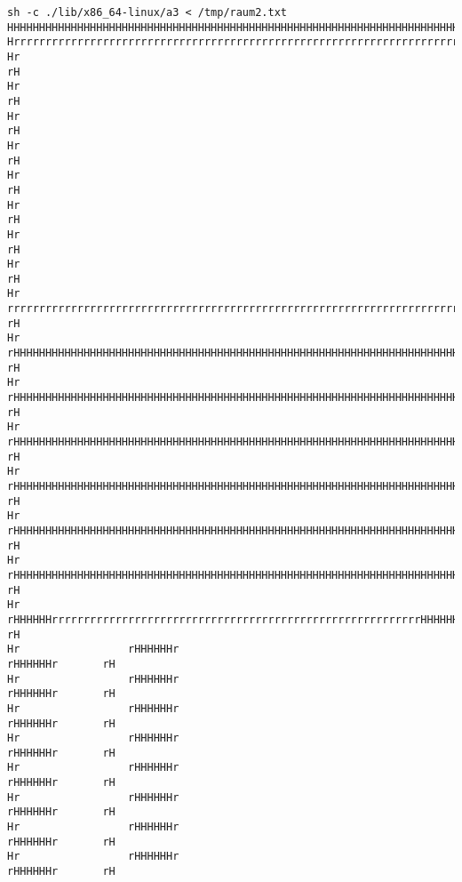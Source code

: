 \documentclass[10pt,a4paper]{article}
\begin{document}
{\begin{verbatim}
sh -c ./lib/x86_64-linux/a3 < /tmp/raum2.txt 
HHHHHHHHHHHHHHHHHHHHHHHHHHHHHHHHHHHHHHHHHHHHHHHHHHHHHHHHHHHHHHHHHHHHHHHHHHHHHHHHHHHHHHHHHHHHHHHHHHHH
HrrrrrrrrrrrrrrrrrrrrrrrrrrrrrrrrrrrrrrrrrrrrrrrrrrrrrrrrrrrrrrrrrrrrrrrrrrrrrrrrrrrrrrrrrrrrrrrrrrH
Hr                                                                                                rH
Hr                                                                                                rH
Hr                                                                                                rH
Hr                                                                                                rH
Hr                                                                                                rH
Hr                                                                                                rH
Hr                                                                                                rH
Hr                                                                                                rH
Hr                 rrrrrrrrrrrrrrrrrrrrrrrrrrrrrrrrrrrrrrrrrrrrrrrrrrrrrrrrrrrrrrrrrrrrrrrr       rH
Hr                 rHHHHHHHHHHHHHHHHHHHHHHHHHHHHHHHHHHHHHHHHHHHHHHHHHHHHHHHHHHHHHHHHHHHHHHr       rH
Hr                 rHHHHHHHHHHHHHHHHHHHHHHHHHHHHHHHHHHHHHHHHHHHHHHHHHHHHHHHHHHHHHHHHHHHHHHr       rH
Hr                 rHHHHHHHHHHHHHHHHHHHHHHHHHHHHHHHHHHHHHHHHHHHHHHHHHHHHHHHHHHHHHHHHHHHHHHr       rH
Hr                 rHHHHHHHHHHHHHHHHHHHHHHHHHHHHHHHHHHHHHHHHHHHHHHHHHHHHHHHHHHHHHHHHHHHHHHr       rH
Hr                 rHHHHHHHHHHHHHHHHHHHHHHHHHHHHHHHHHHHHHHHHHHHHHHHHHHHHHHHHHHHHHHHHHHHHHHr       rH
Hr                 rHHHHHHHHHHHHHHHHHHHHHHHHHHHHHHHHHHHHHHHHHHHHHHHHHHHHHHHHHHHHHHHHHHHHHHr       rH
Hr                 rHHHHHHrrrrrrrrrrrrrrrrrrrrrrrrrrrrrrrrrrrrrrrrrrrrrrrrrrrrrrrrrrHHHHHHr       rH
Hr                 rHHHHHHr                                                        rHHHHHHr       rH
Hr                 rHHHHHHr                                                        rHHHHHHr       rH
Hr                 rHHHHHHr                                                        rHHHHHHr       rH
Hr                 rHHHHHHr                                                        rHHHHHHr       rH
Hr                 rHHHHHHr                                                        rHHHHHHr       rH
Hr                 rHHHHHHr                                                        rHHHHHHr       rH
Hr                 rHHHHHHr                                                        rHHHHHHr       rH
Hr                 rHHHHHHr                                                        rHHHHHHr       rH

\end{verbatim}}
\end{document}
